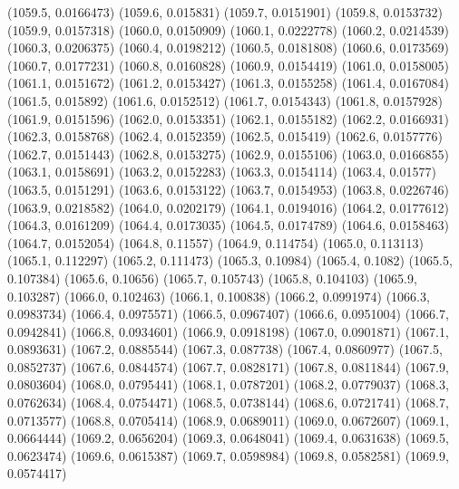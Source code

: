 {					(1059.5, 0.0166473)
					(1059.6, 0.015831)
					(1059.7, 0.0151901)
					(1059.8, 0.0153732)
					(1059.9, 0.0157318)
					(1060.0, 0.0150909)
					(1060.1, 0.0222778)
					(1060.2, 0.0214539)
					(1060.3, 0.0206375)
					(1060.4, 0.0198212)
					(1060.5, 0.0181808)
					(1060.6, 0.0173569)
					(1060.7, 0.0177231)
					(1060.8, 0.0160828)
					(1060.9, 0.0154419)
					(1061.0, 0.0158005)
					(1061.1, 0.0151672)
					(1061.2, 0.0153427)
					(1061.3, 0.0155258)
					(1061.4, 0.0167084)
					(1061.5, 0.015892)
					(1061.6, 0.0152512)
					(1061.7, 0.0154343)
					(1061.8, 0.0157928)
					(1061.9, 0.0151596)
					(1062.0, 0.0153351)
					(1062.1, 0.0155182)
					(1062.2, 0.0166931)
					(1062.3, 0.0158768)
					(1062.4, 0.0152359)
					(1062.5, 0.015419)
					(1062.6, 0.0157776)
					(1062.7, 0.0151443)
					(1062.8, 0.0153275)
					(1062.9, 0.0155106)
					(1063.0, 0.0166855)
					(1063.1, 0.0158691)
					(1063.2, 0.0152283)
					(1063.3, 0.0154114)
					(1063.4, 0.01577)
					(1063.5, 0.0151291)
					(1063.6, 0.0153122)
					(1063.7, 0.0154953)
					(1063.8, 0.0226746)
					(1063.9, 0.0218582)
					(1064.0, 0.0202179)
					(1064.1, 0.0194016)
					(1064.2, 0.0177612)
					(1064.3, 0.0161209)
					(1064.4, 0.0173035)
					(1064.5, 0.0174789)
					(1064.6, 0.0158463)
					(1064.7, 0.0152054)
					(1064.8, 0.11557)
					(1064.9, 0.114754)
					(1065.0, 0.113113)
					(1065.1, 0.112297)
					(1065.2, 0.111473)
					(1065.3, 0.10984)
					(1065.4, 0.1082)
					(1065.5, 0.107384)
					(1065.6, 0.10656)
					(1065.7, 0.105743)
					(1065.8, 0.104103)
					(1065.9, 0.103287)
					(1066.0, 0.102463)
					(1066.1, 0.100838)
					(1066.2, 0.0991974)
					(1066.3, 0.0983734)
					(1066.4, 0.0975571)
					(1066.5, 0.0967407)
					(1066.6, 0.0951004)
					(1066.7, 0.0942841)
					(1066.8, 0.0934601)
					(1066.9, 0.0918198)
					(1067.0, 0.0901871)
					(1067.1, 0.0893631)
					(1067.2, 0.0885544)
					(1067.3, 0.087738)
					(1067.4, 0.0860977)
					(1067.5, 0.0852737)
					(1067.6, 0.0844574)
					(1067.7, 0.0828171)
					(1067.8, 0.0811844)
					(1067.9, 0.0803604)
					(1068.0, 0.0795441)
					(1068.1, 0.0787201)
					(1068.2, 0.0779037)
					(1068.3, 0.0762634)
					(1068.4, 0.0754471)
					(1068.5, 0.0738144)
					(1068.6, 0.0721741)
					(1068.7, 0.0713577)
					(1068.8, 0.0705414)
					(1068.9, 0.0689011)
					(1069.0, 0.0672607)
					(1069.1, 0.0664444)
					(1069.2, 0.0656204)
					(1069.3, 0.0648041)
					(1069.4, 0.0631638)
					(1069.5, 0.0623474)
					(1069.6, 0.0615387)
					(1069.7, 0.0598984)
					(1069.8, 0.0582581)
					(1069.9, 0.0574417)
}
